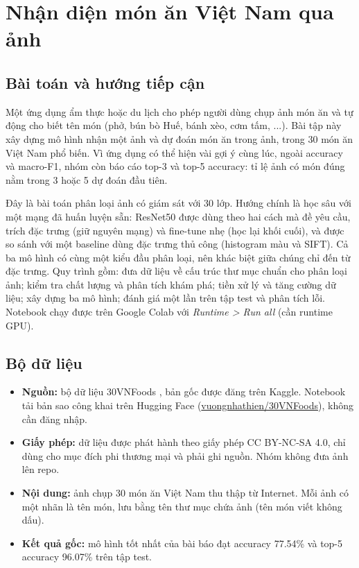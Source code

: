 \chapter{Nhận diện món ăn Việt Nam qua ảnh}

\section{Bài toán và hướng tiếp cận}

Một ứng dụng ẩm thực hoặc du lịch cho phép người dùng chụp ảnh món ăn và tự động cho biết tên món (phở, bún bò Huế,
bánh xèo, cơm tấm, ...). Bài tập này xây dựng mô hình nhận một ảnh và dự đoán món ăn trong ảnh, trong 30 món ăn Việt
Nam phổ biến. Vì ứng dụng có thể hiện vài gợi ý cùng lúc, ngoài accuracy và macro-F1, nhóm còn báo cáo top-3 và top-5
accuracy: tỉ lệ ảnh có món đúng nằm trong 3 hoặc 5 dự đoán đầu tiên.

Đây là bài toán phân loại ảnh có giám sát với 30 lớp. Hướng chính là học sâu với một mạng đã huấn luyện sẵn: ResNet50
\cite{img-resnet} được dùng theo hai cách mà đề yêu cầu, trích đặc trưng (giữ nguyên mạng) và fine-tune nhẹ (học lại
khối cuối), và được so sánh với một baseline dùng đặc trưng thủ công (histogram màu và SIFT). Cả ba mô hình có cùng một
kiểu đầu phân loại, nên khác biệt giữa chúng chỉ đến từ đặc trưng. Quy trình gồm: đưa dữ liệu về cấu trúc thư mục chuẩn
cho phân loại ảnh; kiểm tra chất lượng và phân tích khám phá; tiền xử lý và tăng cường dữ liệu; xây dựng ba mô hình;
đánh giá một lần trên tập test và phân tích lỗi. Notebook chạy được trên Google Colab với \textit{Runtime > Run all}
(cần runtime GPU).

\section{Bộ dữ liệu}

\begin{itemize}
  \item \textbf{Nguồn:} bộ dữ liệu 30VNFoods \cite{img-30vnfoods}, bản gốc được đăng trên Kaggle.
        Notebook tải bản sao công khai trên Hugging Face (\url{vuongnhathien/30VNFoods}), không cần đăng nhập.
  \item \textbf{Giấy phép:} dữ liệu được phát hành theo giấy phép CC BY-NC-SA 4.0, chỉ dùng cho mục đích phi thương
        mại và phải ghi nguồn. Nhóm không đưa ảnh lên repo.
  \item \textbf{Nội dung:} ảnh chụp 30 món ăn Việt Nam thu thập từ Internet. Mỗi ảnh có một nhãn là tên món, lưu bằng tên
        thư mục chứa ảnh (tên món viết không dấu).
  \item \textbf{Kết quả gốc:} mô hình tốt nhất của bài báo đạt accuracy 77.54\% và top-5 accuracy 96.07\% trên tập test.
\end{itemize}

